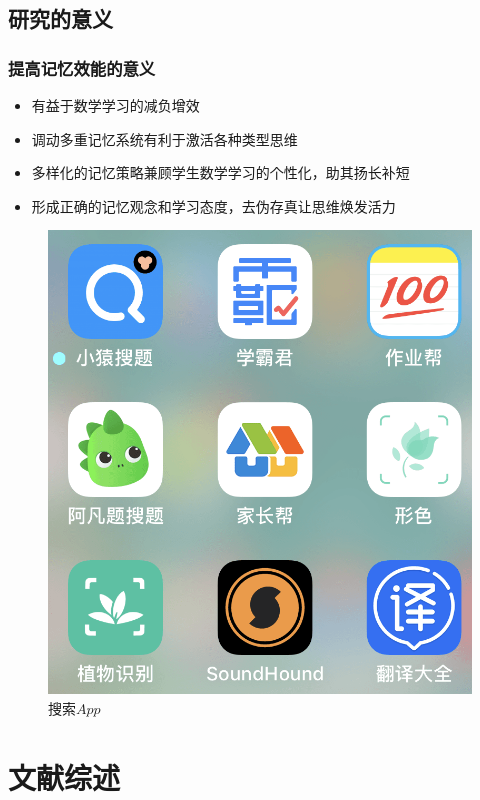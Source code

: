 \documentclass[serif]{beamer}
\begin{document}
  \subsection{研究的意义}
  \begin{frame}\frametitle{提高记忆效能的意义}
  	 \begin{itemize}
  	 	\item 有益于数学学习的减负增效
  	 	\item 调动多重记忆系统有利于激活各种类型思维
  	 	\item 多样化的记忆策略兼顾学生数学学习的个性化，助其扬长补短
  	 	\item 形成正确的记忆观念和学习态度，去伪存真让思维焕发活力
  	 \end{itemize}
   \pause
     \begin{figure}
     	\centering
     	\includegraphics[scale=0.16]{search.png}
     	\caption{搜索$ App $}
     \end{figure}
     
  \end{frame} 

  \section{文献综述}
\end{document}
